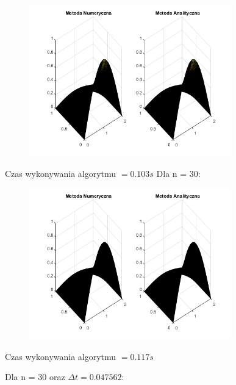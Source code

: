 \begin{figure}[!ht]
	\begin{center}
		\includegraphics[width=0.78\textwidth]{Lab7/charts/df/15_2.png}
	\end{center}
\end{figure}

Czas wykonywania algorytmu $ = 0.103 s$
\newpage
Dla n = 30:

\begin{figure}[!ht]
	\begin{center}
		\includegraphics[width=0.78\textwidth]{Lab7/charts/df/30_2.png}
	\end{center}
\end{figure}

Czas wykonywania algorytmu $ = 0.117 s$

Dla n = 30 oraz $\Delta t = 0.047562$:

